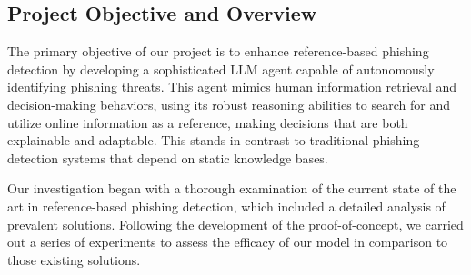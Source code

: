 \subsection{Project Objective and Overview}
The primary objective of our project is to enhance reference-based phishing detection by developing a sophisticated LLM agent capable of autonomously identifying phishing threats. This agent mimics human information retrieval and decision-making behaviors, using its robust reasoning abilities to search for and utilize online information as a reference, making decisions that are both explainable and adaptable. This stands in contrast to traditional phishing detection systems that depend on static knowledge bases.

Our investigation began with a thorough examination of the current state of the art in reference-based phishing detection, which included a detailed analysis of prevalent solutions. Following the development of the proof-of-concept, we carried out a series of experiments to assess the efficacy of our model in comparison to those existing solutions.



